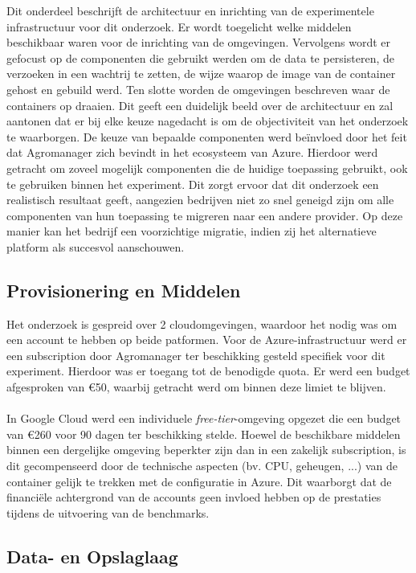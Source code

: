 Dit onderdeel beschrijft de architectuur en inrichting van de experimentele infrastructuur voor dit onderzoek. Er wordt toegelicht welke middelen beschikbaar waren voor de inrichting van de omgevingen. Vervolgens wordt er gefocust op de componenten die gebruikt werden om de data te persisteren, de verzoeken in een wachtrij te zetten, de wijze waarop de image van de container gehost en gebuild werd. Ten slotte worden de omgevingen beschreven waar de containers op draaien. Dit geeft een duidelijk beeld over de architectuur en zal aantonen dat er bij elke keuze nagedacht is om de objectiviteit van het onderzoek te waarborgen. De keuze van bepaalde componenten werd beïnvloed door het feit dat Agromanager zich bevindt in het ecosysteem van Azure. Hierdoor werd getracht om zoveel mogelijk componenten die de huidige toepassing gebruikt, ook te gebruiken binnen het experiment. Dit zorgt ervoor dat dit onderzoek een realistisch resultaat geeft, aangezien bedrijven niet zo snel geneigd zijn om alle componenten van hun toepassing te migreren naar een andere provider. Op deze manier kan het bedrijf een voorzichtige migratie, indien zij het alternatieve platform als succesvol aanschouwen.

\subsection{Provisionering en Middelen}

Het onderzoek is gespreid over 2 cloudomgevingen, waardoor het nodig was om een account te hebben op beide patformen. Voor de Azure-infrastructuur werd er een subscription door Agromanager ter beschikking gesteld specifiek voor dit experiment. Hierdoor was er toegang tot de benodigde quota. Er werd een budget afgesproken van €50, waarbij getracht werd om binnen deze limiet te blijven.
\\
\\
In Google Cloud werd een individuele \textit{free-tier}-omgeving opgezet die een budget van €260 voor 90 dagen ter beschikking stelde. Hoewel de beschikbare middelen binnen een dergelijke omgeving beperkter zijn dan in een zakelijk subscription, is dit gecompenseerd door de technische aspecten (bv. CPU, geheugen, ...) van de container gelijk te trekken met de configuratie in Azure. Dit waarborgt dat de financiële achtergrond van de accounts geen invloed hebben op de prestaties tijdens de uitvoering van de benchmarks.

\subsection{Data- en Opslaglaag}

